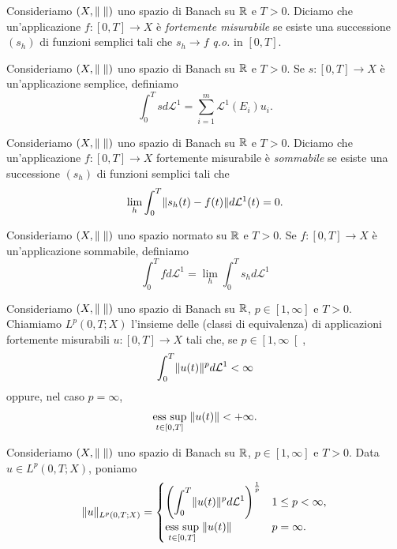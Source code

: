\begin{definizione}
Consideriamo $(X,\lVert\;\rVert)$ uno spazio di Banach su $\mathbb{R}$ e $T>0$. Diciamo che un'applicazione $f: [0,T] \to X$ è \emph{fortemente misurabile} se esiste una successione $(s_h)$ di funzioni semplici tali che $s_h \to f$ \emph{q.o.} in $[0,T]$.
\end{definizione}

\begin{definizione}
Consideriamo $(X,\lVert\;\rVert)$ uno spazio di Banach su $\mathbb{R}$ e $T>0$. Se $s: [0,T] \to X$ è un'applicazione semplice, definiamo 
\[ \int_0^T sd\mathcal{L}^1 = \sum_{i=1}^{m} \mathcal{L}^1(E_i)u_i. \]
\end{definizione}

\begin{definizione}
Consideriamo $(X,\lVert\;\rVert)$ uno spazio di Banach su $\mathbb{R}$ e $T>0$. Diciamo che un'applicazione $f: [0,T] \to X$ fortemente misurabile è \emph{sommabile} se esiste una successione $(s_h)$ di funzioni semplici tali che 
\[ \lim\limits_{h} \int_{0}^{T} \lVert s_h(t)-f(t)\rVert d\mathcal{L}^1(t) = 0.  \]
\end{definizione}

\begin{definizione}
	Consideriamo $(X,\lVert\;\rVert)$ uno spazio normato su $\mathbb{R}$ e $T>0$. Se $f: [0,T] \to X$ è un'applicazione sommabile, definiamo 
	\[ \int_0^T fd\mathcal{L}^1 = \lim\limits_{h} \int_0^T s_hd\mathcal{L}^1 \]
\end{definizione}

\begin{definizione}
Consideriamo $(X,\lVert\;\rVert)$ uno spazio di Banach su $\mathbb{R}$, $p \in [1,\infty]$ e $T>0$. Chiamiamo $L^p(0,T;X)$ l'insieme delle (classi di equivalenza) di applicazioni fortemente misurabili $u: [0,T]\to X$ tali che, se $p \in \left[ 1,\infty\right[$, 
\[ \int_0^T \lVert u(t)\rVert^p d\mathcal{L}^1 <\infty \]
oppure, nel caso $p=\infty$,
\[ \underset{t \in [0,T]}{\textup{ess sup}}\; \lVert u(t)\rVert <+\infty. \]
\end{definizione}

\begin{definizione}
Consideriamo $(X,\lVert\;\rVert)$ uno spazio di Banach su $\mathbb{R}$, $p \in [1,\infty]$ e $T>0$. Data $u \in L^p(0,T;X)$, poniamo 
	\[ \lVert u\rVert_{L^p(0,T;X)} = \begin{cases}
		\left( \displaystyle \int_0^T \lVert u(t)\rVert^p d\mathcal{L}^1\right) ^{\frac{1}{p}} & 1 \le p < \infty, \\
		\underset{t \in [0,T]}{\textup{ess sup}}\; \lVert u(t)\rVert & p=\infty.
	\end{cases} \]
	
\end{definizione}